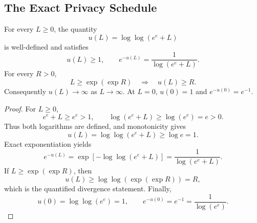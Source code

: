 \subsection{The Exact Privacy Schedule}\label{app:privacy-schedule}

\begin{lemma}\label{lem:step-003-log-correction}
For every \(L\geq0\), the quantity
\[
u(L)=\log\log(e^e+L)
\]
is well-defined and satisfies
\begin{equation}
u(L)\geq1,\qquad
e^{-u(L)}=\frac1{\log(e^e+L)}.
\label{eq:app-a35}
\end{equation}
For every \(R>0\),
\begin{equation}
L\geq\exp(\exp R)\quad\Longrightarrow\quad u(L)\geq R.
\label{eq:app-a36}
\end{equation}
Consequently \(u(L)\to\infty\) as \(L\to\infty\).  At \(L=0\),
\(u(0)=1\) and \(e^{-u(0)}=e^{-1}\).
\end{lemma}

\begin{proof}
For \(L\geq0\),
\begin{equation}
e^e+L\geq e^e>1,\qquad
\log(e^e+L)\geq\log(e^e)=e>0.
\label{eq:app-a37}
\end{equation}
Thus both logarithms are defined, and monotonicity gives
\begin{equation}
u(L)=\log\log(e^e+L)\geq\log e=1.
\label{eq:app-a38}
\end{equation}
Exact exponentiation yields
\begin{equation}
e^{-u(L)}
=\exp[-\log\log(e^e+L)]
=\frac1{\log(e^e+L)}.
\label{eq:app-a39}
\end{equation}
If \(L\geq\exp(\exp R)\), then
\begin{equation}
u(L)\geq
\log\log(\exp(\exp R))=R,
\label{eq:app-a40}
\end{equation}
which is the quantified divergence statement.  Finally,
\begin{equation}
u(0)=\log\log(e^e)=1,\qquad
e^{-u(0)}=e^{-1}=\frac1{\log(e^e)}.
\label{eq:app-a41}
\end{equation}
\end{proof}

